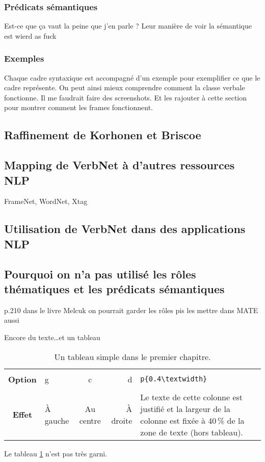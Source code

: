 \subsubsection{Prédicats sémantiques}

Est-ce que ça vaut la peine que j'en parle ? Leur manière de voir la sémantique est wierd as fuck

\subsubsection{Exemples}

Chaque cadre syntaxique est accompagné d'un exemple pour exemplifier ce que le cadre représente. On peut ainsi mieux comprendre comment la classe verbale fonctionne. Il me faudrait faire des screenshots. Et les rajouter à cette section pour montrer comment les frames fonctionnent.

\subsection {Raffinement de Korhonen et Briscoe}

\subsection {Mapping de VerbNet à d'autres ressources NLP} 

FrameNet, WordNet, Xtag

\subsection {Utilisation de VerbNet dans des applications NLP}   

\subsection{Pourquoi on n'a pas utilisé les rôles thématiques et les prédicats sémantiques}

p.210 dans le livre Melcuk
on pourrait garder les rôles pis les mettre dans MATE aussi

Encore du texte\dots et un tableau

\begin{table}[htb]
	\centering
	\caption{Un tableau simple dans le premier chapitre.}
	\label{tab:simple1}
	\begin{tabular}{|c||l|c|r|p{}|}
		\hline			&			&			&			&																															\\
		\textbf{Option}	& g			& c			& d			& \verb|p{0.4\textwidth}|																									\\[3mm]
		\hline\hline	&			&			&			&																															\\
		\textbf{Effet}	& À gauche	& Au centre	& À droite	& Le texte de cette colonne est justifié et la largeur de la colonne est fixée \`a 40\,\% de la zone de texte (hors tableau).	\\[3mm]
		\hline 
	\end{tabular}
\end{table}
Le tableau \ref{tab:simple1} n'est pas tr\`es garni.

